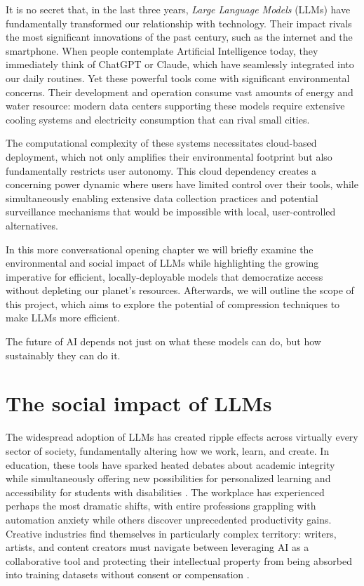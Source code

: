It is no secret that, in the last three years, \textit{Large Language Models} (LLMs) have fundamentally transformed our relationship with technology.
Their impact rivals the most significant innovations of the past century, such as the internet and the smartphone. When people contemplate Artificial Intelligence today, they immediately think of ChatGPT or Claude, which have seamlessly integrated into our daily routines.
Yet these powerful tools come with significant environmental concerns. Their development and operation consume vast amounts of energy and water resource: modern data centers supporting these models require extensive cooling systems and electricity consumption that can rival small cities.

The computational complexity of these systems necessitates cloud-based deployment, which not only amplifies their environmental footprint but also fundamentally restricts user autonomy. This cloud dependency creates a concerning power dynamic where users have limited control over their tools, while simultaneously enabling extensive data collection practices and potential surveillance mechanisms that would be impossible with local, user-controlled alternatives.

In this more conversational opening chapter we will briefly examine the environmental and social impact of LLMs while highlighting the growing imperative for efficient, locally-deployable models that democratize access without depleting our planet's resources. Afterwards, we will outline the scope of this project, which aims to explore the potential of compression techniques to make LLMs more efficient.

The future of AI depends not just on what these models can do, but how sustainably they can do it.

\section{The social impact of LLMs}
The widespread adoption of LLMs has created ripple effects across virtually every sector of society, fundamentally altering how we work, learn, and create. In education, these tools have sparked heated debates about academic integrity while simultaneously offering new possibilities for personalized learning and accessibility for students with disabilities \cite{academic_integrity}. The workplace has experienced perhaps the most dramatic shifts, with entire professions grappling with automation anxiety while others discover unprecedented productivity gains. Creative industries find themselves in particularly complex territory: writers, artists, and content creators must navigate between leveraging AI as a collaborative tool and protecting their intellectual property from being absorbed into training datasets without consent or compensation \cite{artistic_integrity}.

